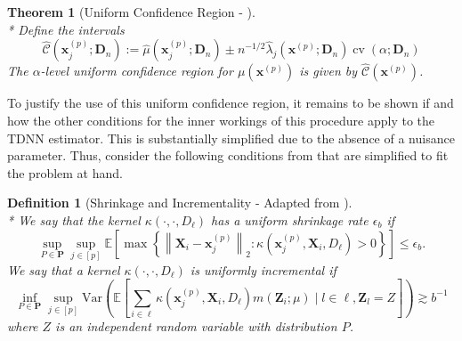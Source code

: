\documentclass[letterpaper,10pt]{article}
\numberwithin{equation}{section}
\newtheorem{thm}{Theorem}
\numberwithin{thm}{section}
\newtheorem{dfn}{Definition}
\numberwithin{lem}{section}
\numberwithin{cor}{section}
\renewcommand{\hat}{\widehat}
\newcommand{\E}{\mathbb{E}}
\newcommand{\1}{\mathbbm{1}}
\newcommand{\Var}{\text{Var}}
\begin{document}
\begin{thm}[Uniform Confidence Region - \citet{ritzwoller_uniform_2024}]\mbox{}\\*
	Define the intervals
	\begin{equation}
		\hat{\mathcal{C}}\left(\mathbf{x}^{(p)}_j; \mathbf{D}_n\right)
		:= \hat{\mu}\left(\mathbf{x}^{(p)}_{j}; \mathbf{D}_n\right) \pm
		n^{-1/2} \hat{\lambda}_{j}\left(\mathbf{x}^{(p)}; \mathbf{D}_n\right)\operatorname{cv}\left(\alpha; \mathbf{D}_n\right)
	\end{equation}
	The $\alpha$-level uniform confidence region for $\mu\left(\mathbf{x}^{(p)}\right)$ is given by $\hat{\mathcal{C}}\left(\mathbf{x}^{(p)}\right)$.
\end{thm}

To justify the use of this uniform confidence region, it remains to be shown if and how the other conditions for the inner workings of this procedure apply to the TDNN estimator.
This is substantially simplified due to the absence of a nuisance parameter.
Thus, consider the following conditions from \cite{ritzwoller_uniform_2024} that are simplified to fit the problem at hand.


\begin{dfn}[Shrinkage and Incrementality - Adapted from \citet{ritzwoller_uniform_2024}]\mbox{}\\*
	We say that the kernel $\kappa\left(\cdot, \cdot, D_{\ell}\right)$ has a uniform shrinkage rate $\epsilon_b$ if
	\begin{equation}
		\sup_{P \in \mathbf{P}} \sup_{j \in[p]}
		\E\left[\max \left\{\left\|\mathbf{X}_i-\mathbf{x}^{(p)}_{j}\right\|_{2}: \kappa\left(\mathbf{x}^{(p)}_{j}, \mathbf{X}_i, D_{\ell}\right)>0\right\}\right]
		\leq \epsilon_b .
	\end{equation}
	We say that a kernel $\kappa\left(\cdot, \cdot, D_{\ell}\right)$ is uniformly incremental if
	\begin{equation}
		\inf_{P \in \mathbf{P}} \sup_{j \in[p]}
		\Var\left(\E\left[\sum_{i \in \ell} \kappa\left(\mathbf{x}^{(p)}_{j}, \mathbf{X}_i, D_{\ell}\right) m\left(\mathbf{Z}_i ; \mu\right) \mid l \in \ell, \mathbf{Z}_l = Z\right]\right)
		\gtrsim b^{-1}
	\end{equation}
	where $Z$ is an independent random variable with distribution $P$.
\end{dfn}
\end{document}
